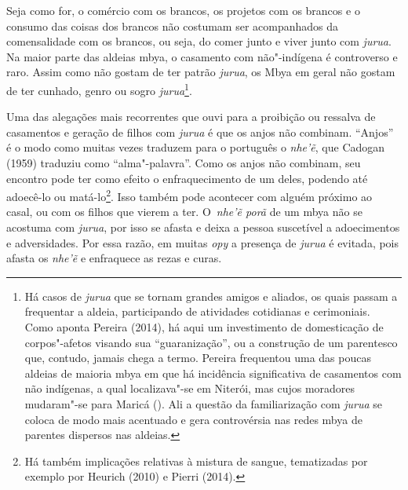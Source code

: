 Seja como for, o comércio com os brancos, os projetos com os brancos e o
consumo das coisas dos brancos não costumam ser acompanhados da
comensalidade com os brancos, ou seja, do comer junto e viver junto com
\emph{jurua}. Na maior parte das aldeias mbya, o casamento com não"-indígena é
controverso e raro. Assim como não gostam de ter patrão \emph{jurua}, os Mbya
em geral não gostam de ter cunhado, genro ou sogro \emph{jurua}\footnote{Há
casos de \emph{jurua} que se tornam grandes amigos e aliados, os quais passam
a frequentar a aldeia, participando de atividades cotidianas e
cerimoniais. Como aponta Pereira (2014), há aqui um investimento de
domesticação de corpos"-afetos visando sua ``guaranização'', ou a
construção de um parentesco que, contudo, jamais chega a termo. Pereira
frequentou uma das poucas aldeias de maioria mbya em que há incidência
significativa de casamentos com não indígenas, a qual localizava"-se em
Niterói, mas cujos moradores mudaram"-se para Maricá (). Ali a questão
da familiarização com \emph{jurua} se coloca de modo mais acentuado e gera
controvérsia nas redes mbya de parentes dispersos nas aldeias.}. 

Uma das alegações mais recorrentes que ouvi para a proibição ou ressalva
de casamentos e geração de filhos com \emph{jurua} é que os anjos não
combinam. ``Anjos'' é o modo como muitas vezes traduzem para o português
o \emph{nhe’ẽ}, que Cadogan (1959) traduziu como ``alma"-palavra''. Como os
anjos não combinam, seu encontro pode ter como efeito o enfraquecimento
de um deles, podendo até adoecê-lo ou matá-lo\footnote{Há também
implicações relativas à mistura de sangue, tematizadas por exemplo por
Heurich (2010) e Pierri (2014).}. Isso também pode acontecer com alguém
próximo ao casal, ou com os filhos que vierem a ter. O~\emph{nhe’ẽ porã}
de um mbya não se acostuma com \emph{jurua}, por isso se afasta e deixa a
pessoa suscetível a adoecimentos e adversidades. Por essa razão, em
muitas \emph{opy} a presença de \emph{jurua} é evitada, pois afasta os \emph{nhe’ẽ} e
enfraquece as rezas e curas.

